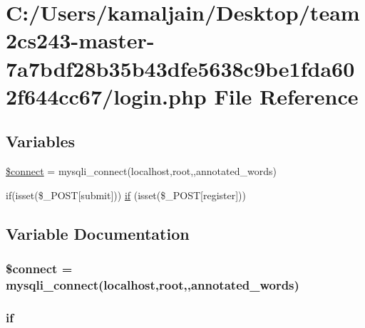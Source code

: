 \hypertarget{login_8php}{}\section{C\+:/\+Users/kamaljain/\+Desktop/team2cs243-\/master-\/7a7bdf28b35b43dfe5638c9be1fda602f644cc67/login.php File Reference}
\label{login_8php}
\subsection*{Variables}
\begin{DoxyCompactItemize}
\item 
\hyperlink{login_8php_a956617395b85e98d907df712f6d0d3f7}{\$connect} = mysqli\+\_\+connect(\textquotesingle{}localhost\textquotesingle{},\textquotesingle{}root\textquotesingle{},\textquotesingle{}\textquotesingle{},\textquotesingle{}annotated\+\_\+words\textquotesingle{})
\item 
if(isset(\$\+\_\+\+P\+O\+ST\mbox{[}\textquotesingle{}submit\textquotesingle{}\mbox{]})) \hyperlink{login_8php_a6cf3ef86567b2d2e235730bbe61cb311}{if} (isset(\$\+\_\+\+P\+O\+ST\mbox{[}\textquotesingle{}register\textquotesingle{}\mbox{]}))
\end{DoxyCompactItemize}


\subsection{Variable Documentation}
\subsubsection[{\texorpdfstring{\$connect}{$connect}}]{\setlength{\rightskip}{0pt plus 5cm}\$connect = mysqli\+\_\+connect(\textquotesingle{}localhost\textquotesingle{},\textquotesingle{}root\textquotesingle{},\textquotesingle{}\textquotesingle{},\textquotesingle{}annotated\+\_\+words\textquotesingle{})}\hypertarget{login_8php_a956617395b85e98d907df712f6d0d3f7}{}\label{login_8php_a956617395b85e98d907df712f6d0d3f7}
\subsubsection[{\texorpdfstring{if}{if}}]{\setlength{\rightskip}{0pt plus 5cm}if}\hypertarget{login_8php_a6cf3ef86567b2d2e235730bbe61cb311}{}\label{login_8php_a6cf3ef86567b2d2e235730bbe61cb311}
